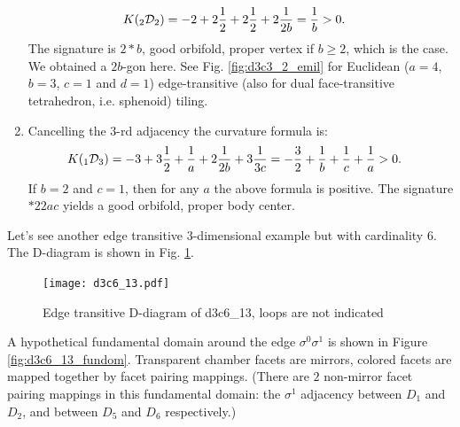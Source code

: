 \documentclass[12pt,a4paper]{article}
\numberwithin{equation}{section}
\newcommand{\leftsub}[2]{{\vphantom{#2}}_{#1}{#2}}
\theoremstyle{plain}%
\theoremstyle{definition}
\theoremstyle{remark}
\begin{document}
\begin{enumerate}
    \begin{align*}
      K(\leftsub{2}{\mathcal{D}}_2)&= -2 + 2\frac{1}{2} + 2\frac{1}{2} +
      2\frac{1}{2b} = \frac{1}{b} > 0.
    \end{align*}
    The signature is $2*b$, good orbifold, proper vertex if $b\geq2$, which is
    the case. We obtained a $2b$-gon here. See Fig. \ref{fig:d3c3_2_emil} for
    Euclidean ($a=4$, $b=3$, $c=1$ and $d=1$) edge-transitive (also for dual
    face-transitive tetrahedron, i.e. sphenoid) tiling.
  \item Cancelling the $3$-rd adjacency the curvature formula is:
    \begin{align*}
      K(\leftsub{1}{\mathcal{D}}_3)&= -3 + 3\frac{1}{2} + \frac{1}{a} +
      2\frac{1}{2b} + 3\frac{1}{3c} =
       -\frac{3}{2} + \frac{1}{b} + \frac{1}{c} + \frac{1}{a} > 0.
    \end{align*}
    If $b=2$ and $c=1$, then for any $a$ the above formula is positive.
    The signature $*22ac$ yields a good orbifold, proper body center.
\end{enumerate}







Let's see another edge transitive $3$-dimensional example but with cardinality $6$. The
D-diagram is shown in Fig.
\ref{fig:d3c6_13}.

\begin{figure}
  \caption{\label{fig:d3c6_13} Edge transitive D-diagram of d3c6\_13, loops are not indicated}
  \center
  \texttt{[image: d3c6\_13.pdf]}
\end{figure}

A hypothetical fundamental domain around the edge $\sigma^0\sigma^1$ is shown in
Figure \ref{fig:d3c6_13_fundom}.
Transparent chamber facets are mirrors, colored facets are mapped together by
facet pairing mappings. (There are $2$ non-mirror facet pairing mappings in this
fundamental domain: the $\sigma^1$ adjacency between $D_1$ and $D_2$, and
between $D_5$ and $D_6$ respectively.)
\end{document}
